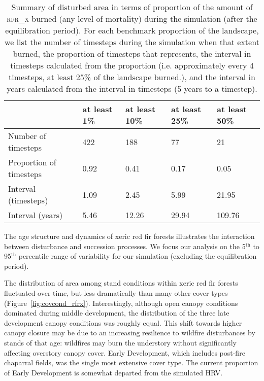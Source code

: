 \begin{table}[!htbp]
\small
\centering
\caption{Summary of disturbed area in terms of proportion of the amount of \textsc{rfr\_x} burned (any level of mortality) during the simulation (after the equilibration period). For each benchmark proportion of the landscape, we list the number of timesteps during the simulation when that extent burned, the proportion of timesteps that represents, the interval in timesteps calculated from the proportion (i.e. approximately every 4 timesteps, at least 25\% of the landscape burned.), and the interval in years calculated from the interval in timesteps (5 years to a timestep).}
\label{tab:darea_atleast_rfrx}
\begin{tabular}{@{}lllll@{}}
                        & at least 1\% & at least 10\% & at least 25\% & at least 50\% \\ \midrule
Number of timesteps     & 422          & 188           & 77            & 21            \\
Proportion of timesteps & 0.92         & 0.41          & 0.17          & 0.05          \\
Interval (timesteps)    & 1.09         & 2.45          & 5.99          & 21.95         \\
Interval (years)        & 5.46         & 12.26         & 29.94         & 109.76       \\ \bottomrule
\end{tabular}
\end{table}


The age structure and dynamics of xeric red fir forests illustrates the interaction between disturbance and succession processes. We focus our analysis on the 5$^{\text{th}}$ to 95$^{\text{th}}$ percentile range of variability for our simulation (excluding the equilibration period). %

The distribution of area among stand conditions within xeric red fir forests fluctuated over time, but less dramatically than many other cover types (Figure~\ref{fig:covcond_rfrx}). Interestingly, although open canopy conditions dominated during middle development, the distribution of the three late development canopy conditions was roughly equal. This shift towards higher canopy closure may be due to an increasing resilience to wildfire disturbances by stands of that age: wildfires may burn the understory without significantly affecting overstory canopy cover. Early Development, which includes post-fire chaparral fields, was the single most extensive cover type. The current proportion of Early Development is somewhat departed from the simulated HRV. %

